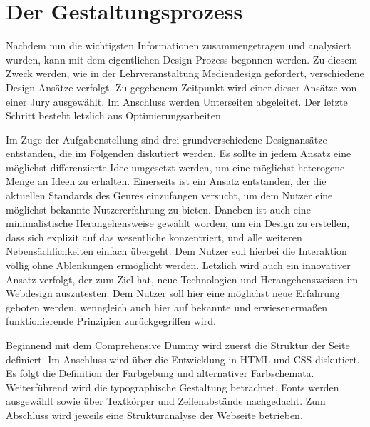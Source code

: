 \chapter{Der Gestaltungsprozess}
Nachdem nun die wichtigsten Informationen zusammengetragen und analysiert wurden, kann mit dem eigentlichen Design-Prozess begonnen werden. Zu diesem Zweck werden, wie in der Lehrveranstaltung Mediendesign gefordert, verschiedene Design-Ansätze verfolgt. Zu gegebenem Zeitpunkt wird einer dieser Ansätze von einer Jury ausgewählt. Im Anschluss werden Unterseiten abgeleitet. Der letzte Schritt besteht letzlich aus Optimierungsarbeiten.

Im Zuge der Aufgabenstellung sind drei grundverschiedene Designansätze entstanden, die im Folgenden diskutiert werden. Es sollte in jedem Ansatz eine möglichst differenzierte Idee umgesetzt werden, um eine möglichst heterogene Menge an Ideen zu erhalten.
Einerseits ist ein Ansatz entstanden, der die aktuellen Standards des Genres einzufangen versucht, um dem Nutzer eine möglichst bekannte Nutzererfahrung zu bieten. Daneben ist auch eine minimalistische Herangehensweise gewählt worden, um ein Design zu erstellen, dass sich explizit auf das wesentliche konzentriert, und alle weiteren Nebensächlichkeiten einfach übergeht. Dem Nutzer soll hierbei die Interaktion völlig ohne Ablenkungen ermöglicht werden. Letzlich wird auch ein innovativer Ansatz verfolgt, der zum Ziel hat, neue Technologien und Herangehensweisen im Webdesign auszutesten. Dem Nutzer soll hier eine möglichst neue Erfahrung geboten werden, wenngleich auch hier auf bekannte und erwiesenermaßen funktionierende Prinzipien zurückgegriffen wird.

Beginnend mit dem Comprehensive Dummy wird zuerst die Struktur der Seite definiert. Im Anschluss wird über die Entwicklung in HTML und CSS diskutiert. Es folgt die Definition der Farbgebung und alternativer Farbschemata. Weiterführend wird die typographische Gestaltung betrachtet, Fonts werden ausgewählt sowie über Textkörper und Zeilenabstände nachgedacht. Zum Abschluss wird jeweils eine Strukturanalyse der Webseite betrieben.








